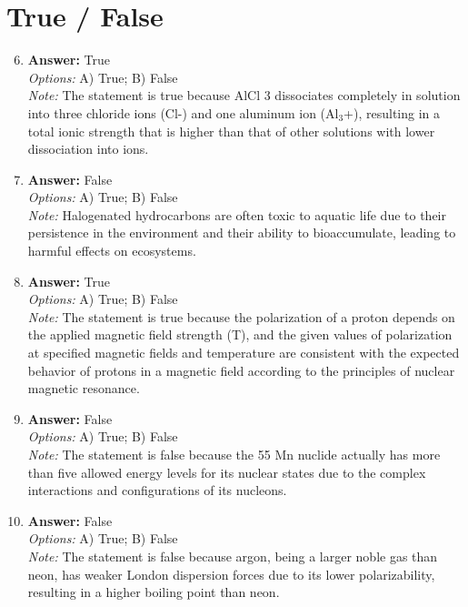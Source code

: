 \documentclass[12pt]{article}
\begin{document}
\section*{True / False}
\begin{enumerate}[label=\arabic*.]
\setcounter{enumi}{5}
\item \textbf{Answer:} True
\\ \textit{Options:} A) True; B) False
\\ \textit{Note:} The statement is true because AlCl 3 dissociates completely in solution into three chloride ions (Cl-) and one aluminum ion (Al$_{3}$+), resulting in a total ionic strength that is higher than that of other solutions with lower dissociation into ions.
\item \textbf{Answer:} False
\\ \textit{Options:} A) True; B) False
\\ \textit{Note:} Halogenated hydrocarbons are often toxic to aquatic life due to their persistence in the environment and their ability to bioaccumulate, leading to harmful effects on ecosystems.
\item \textbf{Answer:} True
\\ \textit{Options:} A) True; B) False
\\ \textit{Note:} The statement is true because the polarization of a proton depends on the applied magnetic field strength (T), and the given values of polarization at specified magnetic fields and temperature are consistent with the expected behavior of protons in a magnetic field according to the principles of nuclear magnetic resonance.
\item \textbf{Answer:} False
\\ \textit{Options:} A) True; B) False
\\ \textit{Note:} The statement is false because the 55 Mn nuclide actually has more than five allowed energy levels for its nuclear states due to the complex interactions and configurations of its nucleons.
\item \textbf{Answer:} False
\\ \textit{Options:} A) True; B) False
\\ \textit{Note:} The statement is false because argon, being a larger noble gas than neon, has weaker London dispersion forces due to its lower polarizability, resulting in a higher boiling point than neon.
\end{enumerate}
\end{document}
